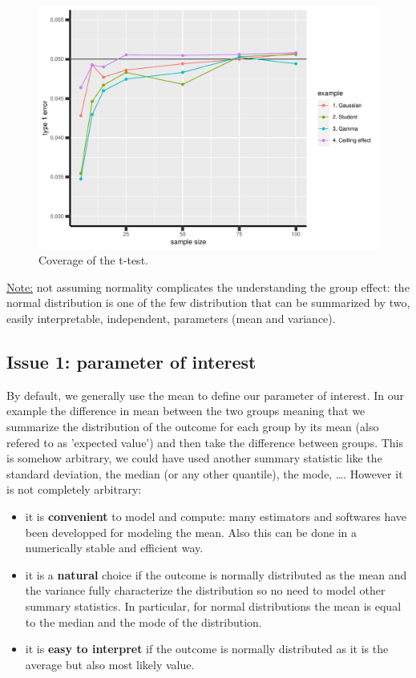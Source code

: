 \documentclass[12pt]{article}
\begin{document}
\begin{figure}[!h]
\centering
\includegraphics[width=\textwidth]{./figures/examples-coverage.pdf}
\caption{\label{fig:coverage}Coverage of the t-test.}
\end{figure}

\uline{Note:} not assuming normality complicates the understanding the group
  effect: the normal distribution is one of the few distribution that
  can be summarized by two, easily interpretable, independent,
  parameters (mean and variance).

\clearpage

\subsection{Issue 1: parameter of interest}
\label{sec:org238e88b}

By default, we generally use the mean to define our parameter of
interest. In our example the difference in mean between the two groups
meaning that we summarize the distribution of the outcome for each
group by its mean (also refered to as 'expected value') and then take the difference
between groups. This is somehow arbitrary, we could have used another
summary statistic like the standard deviation, the median (or any
other quantile), the mode, \ldots. However it is not completely arbitrary:
\begin{itemize}
\item it is \textbf{convenient} to model and compute: many estimators and softwares
have been developped for modeling the mean. Also this can be done
in a numerically stable and efficient way.
\item it is a \textbf{natural} choice if the outcome is normally distributed as
the mean and the variance fully characterize the distribution so no
need to model other summary statistics. In particular, for normal
distributions the mean is equal to the median and the mode of the
distribution.
\item it is \textbf{easy to interpret} if the outcome is normally distributed as
it is the average but also most likely value.
\end{itemize}
\end{document}
